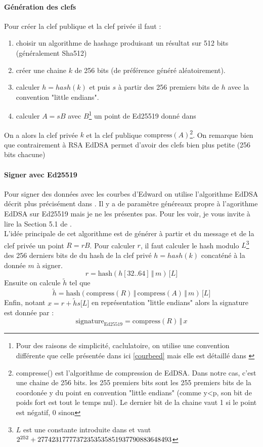 \documentclass[a4paper, 12pt]{article}
\begin{document}
\paragraph{Génération des clefs}
\noindent Pour créer la clef publique et la clef privée il faut :
\begin{enumerate}
	\item choisir un algorithme de hashage produisant un résultat sur 512 bits (généralement Sha512)
	\item créer une chaine $k$ de 256 bits (de préférence généré aléatoirement).
	\item calculer $h = hash(k)$ et puis $s$ à partir des 256 premiers bits de $h$ avec la convention "little endians".
	\item calculer $A = sB$ avec $B$\footnote{Pour des raisons de simplicité, caclulatoire, on utilise une convention différente que celle présentée dans ici \ref{courbeed} mais elle est détaillé dans \cite{eddsa}} un point de Ed25519 donné dans \cite{eddsa}\\
\end{enumerate}

On a alors la clef privée $k$ et la clef publique $\text{compress}(A)$\footnote{compresse() est l'algorithme de compression de EdDSA. Dans notre cas, c'est une chaine de 256 bits. les 255 premiers bits sont les 255 premiers bits de la coordonée y du point en convention "little endians" (comme y<p, son bit de poids fort est tout le temps nul). Le dernier bit de la chaine vaut 1 si le point est négatif, 0 sinon}. On remarque bien que contrairement à RSA EdDSA permet d'avoir des clefs bien plus petite (256 bits chacune)
\paragraph{Signer avec Ed25519}\label{signerEd25519}
Pour signer des données avec les courbes d'Edward on utilise l'algorithme EdDSA décrit plus précisément dans \cite{eddsa}.
Il y a de paramètre généreaux propre à l'agorithme EdDSA sur Ed25519 mais je ne les présentes pas. Pour les voir, je vous invite à lire la Section 5.1 de \cite{eddsa}.\\

L'idée principale de cet algorithme est de générer à partir et du message et de la clef privée un point $R = rB$.
Pour calculer $r$, il faut calculer le hash modulo $L$\footnote{$L$ est une constante introduite dans \cite{eddsa} et vaut $2^{252}+2774231777737235353585193779088364\\8493$} des 256 derniers bits de du hash de la clef privé $h = hash(k)$ concaténé à la donnée $m$ à signer.
$$
r = \text{hash}\left(h[32..64] \, \hyperref[concat]{\Vert} \, m\right) \, \lbrack L \rbrack
$$
Ensuite on calcule $\tilde{h}$ tel que
$$
\tilde{h} = \text{hash}\left(\text{compress}(R) \, \hyperref[concat]{\Vert} \, \text{compress}(A) \, \hyperref[concat]{\Vert} \, m\right) \, \lbrack L \rbrack
$$
Enfin, notant $x = r+\tilde{h}s \lbrack L \rbrack$ en représentation "little endians" alors la signature est donnée par :
$$
\text{signature}_{\text{Ed25519}} = \text{compress}(R) \, \hyperref[concat]{\Vert} \, x
$$
\end{document}

